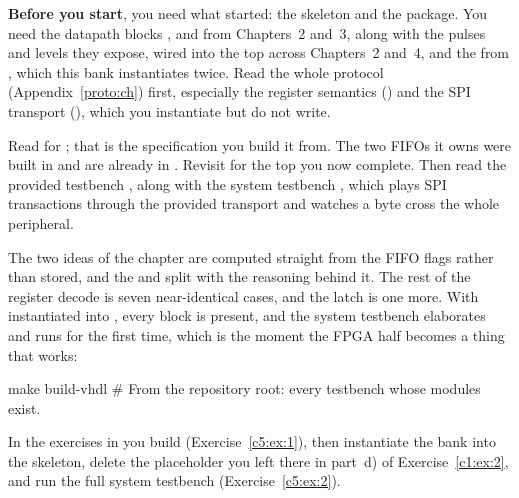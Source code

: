 \textbf{Before you start}, you need what  started: the  skeleton and the
 package. You need the datapath blocks ,  and
 from Chapters~2 and~3, along with the pulses and levels they expose, wired into the
top across Chapters~2 and~4, and the  from , which this bank instantiates
twice. Read the whole protocol (Appendix~\ref{proto:ch}) first, especially the register semantics
() and the SPI transport (), which you instantiate but
do not write.

Read  for ; that is the specification you build it from.
The two FIFOs it owns were built in  and are already in . Revisit
 for the top you now complete. Then read the provided testbench
, along with the system testbench , which plays
SPI transactions through the provided transport and watches a byte cross the whole peripheral.

The two ideas of the chapter are  computed straight from the FIFO flags rather than
stored, and the  and  split with the reasoning behind it. The rest of the
register decode is seven near-identical cases, and the  latch is one more. With
 instantiated into , every block is present, and the system testbench
elaborates and runs for the first time, which is the moment the FPGA half becomes a thing that
works:

\begin{shell}
make build-vhdl   # From the repository root: every testbench whose modules exist.
\end{shell}

\noindent In the exercises in  you build 
(Exercise~\ref{c5:ex:1}), then instantiate the bank into the  skeleton, delete the
 placeholder you left there in part~d) of Exercise~\ref{c1:ex:2}, and run the full
system testbench (Exercise~\ref{c5:ex:2}).





